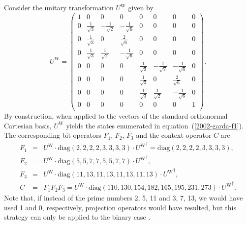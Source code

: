 \documentclass{article}
\begin{document}
 Consider the unitary transformation $U^{\textrm{W}}$ given by
 \begin{equation}
 U^{\textrm{W}}= \left(
 \begin{array}{rrrrrrrr}
  1 & 0 & 0 & 0 & 0 & 0 & 0 & 0 \\
 0 & \frac{1}{{\sqrt{3}}} & -\frac{1}{{\sqrt{2}}} & - \frac{1}{{\sqrt{6}}} & 0 & 0 & 0 & 0\\
 0 & \frac{1}{{\sqrt{3}}} & 0 & \frac{2}{{\sqrt{6}}}                       & 0 & 0 & 0 & 0 \\
 0 & \frac{1}{{\sqrt{3}}} &  \frac{1}{{\sqrt{2}}} & -\frac{1}{{\sqrt{6}}} & 0 & 0 & 0 & 0\\
 0 & 0 & 0 & 0 &\frac{1}{{\sqrt{3}}} & -\frac{1}{{\sqrt{2}}} & - \frac{1}{{\sqrt{6}}}                                                                        & 0\\
 0 & 0 & 0 & 0 &\frac{1}{{\sqrt{3}}} & 0 & \frac{2}{{\sqrt{6}}}                                                                                             & 0\\
 0 & 0 & 0 & 0 &\frac{1}{{\sqrt{3}}} &  \frac{1}{{\sqrt{2}}} & -\frac{1}{{\sqrt{6}}}                                                                        & 0\\
 0 & 0 & 0 & 0 & 0 & 0 & 0 & 1 \\
 \end{array}  \right).
 \end{equation}
By construction, when
applied to the vectors of the standard orthonormal Cartesian basis,
$U^{\textrm{W}}$ yields the states
enumerated in equation~(\ref{2002-garda-f1}).
 The corresponding bit operators $F_1$, $F_2$, $F_3$ and the context operator $C$ are
\begin{equation}
 \begin{array}{lll}
 F_1&=&U^{\textrm{W}}\cdot \textrm{diag}\left(2,2,2,2,3,3,3,3\right)\cdot {U^{\textrm{W}}}^\dagger =\textrm{diag}\left(2,2,2,2,3,3,3,3\right)
 ,     \\
 F_2&=&U^{\textrm{W}}\cdot \textrm{diag}\left(5,5,7,7,5,5,7,7\right)\cdot {U^{\textrm{W}}}^\dagger
 ,       \\
 F_3&=&U^{\textrm{W}}\cdot \textrm{diag}\left(11,13,11,13,11,13,11,13\right)\cdot {U^{\textrm{W}}}^\dagger
 , \\
 C&=&F_1F_2F_3=U^{\textrm{W}}\cdot \textrm{diag}\left(110, 130, 154, 182, 165, 195, 231, 273\right)\cdot {U^{\textrm{W}}}^\dagger
 .
 \end{array}
 \end{equation}
Note that, if instead of
the prime numbers 2, 5, 11 and 3, 7, 13, we would have used 1 and 0, respectively,
projection operators would have resulted, but this strategy can
only be applied to the binary case \cite{DonSvo01}.
\end{document}
